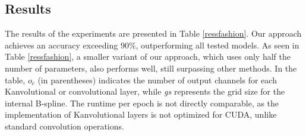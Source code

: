 \documentclass[conference]{IEEEtran}
\begin{document}
\subsection{Results}

The results of the experiments are presented in Table \ref{ressfashion}. Our
approach achieves an accuracy exceeding 90\%, outperforming all tested models.
As seen in Table \ref{ressfashion}, a smaller variant of our approach, which
uses only half the number of parameters, also performs well, still surpassing
other methods. In the table, \( o_{c} \) (in parentheses) indicates the number
of output channels for each Kanvolutional or convolutional layer, while
\textit{gs} represents the grid size for the internal B-spline. The runtime per
epoch is not directly comparable, as the implementation of Kanvolutional layers
is not optimized for CUDA, unlike standard convolution operations.
\end{document}
